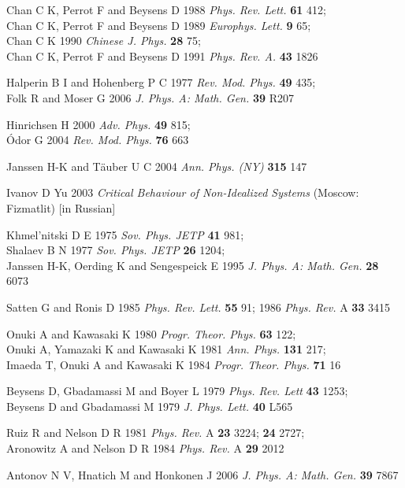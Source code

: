\documentclass []{rusthesis} %
\begin{document}
\begin{thebibliography}{99}
Chan C K, Perrot F and Beysens D 1988
{\it Phys. Rev. Lett.}
{\bf 61} 412;\\
Chan C K, Perrot F and Beysens D 1989
{\it Europhys. Lett.}
{\bf 9} 65;\\
Chan C K 1990 
{\it Chinese J. Phys.}
{\bf 28} 75;\\
Chan C K, Perrot F and Beysens D 1991
{\it Phys. Rev. A.}
{\bf 43} 1826

 Halperin B I and Hohenberg P C 1977 {\it Rev. Mod. Phys.}
{\bf 49} 435;\\ Folk R and Moser G 2006 {\it J. Phys. A: Math. Gen.}
{\bf 39} R207

 Hinrichsen H 2000 {\it Adv. Phys.} {\bf 49} 815;\\
 \'Odor G 2004 {\it Rev. Mod. Phys.} {\bf 76} 663

 Janssen H-K and T\"{a}uber U C 2004 {\it Ann. Phys. (NY)}
{\bf 315} 147

 Ivanov D Yu 2003 {\it Critical Behaviour of
Non-Idealized Systems} (Moscow: Fizmatlit) [in Russian]

 Khmel'nitski D E 1975 {\it Sov. Phys. JETP} {\bf 41} 981;\\
Shalaev B N 1977 {\it Sov. Phys. JETP} {\bf 26} 1204;\\
Janssen H-K, Oerding K and Sengespeick E 1995
{\it J. Phys. A: Math. Gen.} {\bf 28} 6073

 Satten G and Ronis D 1985 {\it Phys. Rev. Lett.}
{\bf 55} 91; 1986 {\it Phys. Rev.} A {\bf 33} 3415

 Onuki A and Kawasaki K 1980 {\it Progr. Theor. Phys.}
{\bf 63} 122;\\
Onuki A, Yamazaki K and Kawasaki K 1981 {\it Ann. Phys.} {\bf 131} 217;\\
Imaeda T, Onuki A and Kawasaki K 1984 {\it Progr. Theor. Phys.} {\bf 71} 16

 Beysens D, Gbadamassi M and Boyer L 1979
{\it Phys. Rev. Lett} {\bf 43} 1253;\\
Beysens D and Gbadamassi M 1979 {\it J. Phys. Lett.} {\bf 40} L565

 Ruiz R and Nelson D R 1981 {\it Phys. Rev.} A {\bf 23}
3224; {\bf 24} 2727;\\
Aronowitz A and Nelson D R 1984 {\it Phys. Rev.} A {\bf 29} 2012



 Antonov N V, Hnatich M and Honkonen J 2006
{\it J. Phys. A: Math. Gen.} {\bf 39} 7867


\end{thebibliography}
\end{document}
